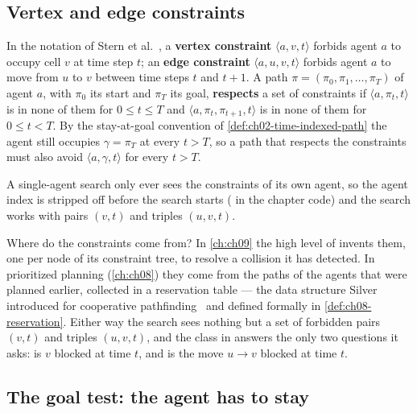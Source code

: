 \subsection{Vertex and edge constraints}

\begin{definition}
\label{def:ch04-constraints}
In the notation of Stern et al.~\cite{stern2019mapf}, a \textbf{vertex
constraint} $\langle a, v, t \rangle$ forbids agent $a$
to occupy cell $v$ at time step $t$; an \textbf{edge
constraint} $\langle a, u, v, t \rangle$ forbids agent
$a$ to move from $u$ to $v$ between time steps $t$ and $t+1$. A path
$\pi = (\pi_0, \pi_1, \dots, \pi_T)$ of agent $a$, with $\pi_0$ its start and
$\pi_T$ its goal, \textbf{respects} a set of constraints if $\langle a, \pi_t,
t\rangle$ is in none of them for $0 \le t \le T$ and $\langle a, \pi_t,
\pi_{t+1}, t\rangle$ is in none of them for $0 \le t < T$. By the stay-at-goal
convention of \cref{def:ch02-time-indexed-path} the agent still occupies
$\gamma = \pi_T$ at every $t > T$, so a path that respects the constraints must
also avoid $\langle a, \gamma, t\rangle$ for every $t > T$.
\end{definition}

A single-agent search only ever sees the constraints of its own agent, so the
agent index is stripped off before the search starts
( in the chapter code) and the search works with
pairs $(v, t)$ and triples $(u, v, t)$.

Where do the constraints come from? In \cref{ch:ch09} the high level of \cbs
invents them, one per node of its constraint tree, to resolve a collision it has
detected. In prioritized planning (\cref{ch:ch08}) they come from the paths of
the agents that were planned earlier, collected in a reservation table --- the
data structure Silver introduced for cooperative
pathfinding~\cite{silver2005cooperative} and defined formally in
\cref{def:ch08-reservation}. Either way the search sees nothing but a set of
forbidden pairs $(v, t)$ and triples $(u, v, t)$, and the class
 in  answers the only two questions
it asks: is $v$ blocked at time $t$, and is the move $u \to v$ blocked at
time $t$.

\subsection{The goal test: the agent has to stay}
\label{sec:ch04-goalstay}


